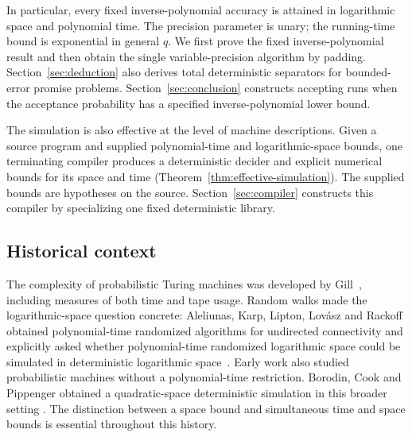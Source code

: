 In particular, every fixed inverse-polynomial accuracy is attained in
logarithmic space and polynomial time. The precision parameter is unary;
the running-time bound is exponential in general $q$. We first prove
the fixed inverse-polynomial result and then obtain the single
variable-precision algorithm by padding. Section~\ref{sec:deduction}
also derives total deterministic separators for bounded-error promise
problems. Section~\ref{sec:conclusion} constructs accepting runs when
the acceptance probability has a specified inverse-polynomial lower bound.

The simulation is also effective at the level of machine descriptions.
Given a source program and supplied polynomial-time and logarithmic-space
bounds, one terminating compiler produces a deterministic decider and
explicit numerical bounds for its space and time
(Theorem~\ref{thm:effective-simulation}). The supplied bounds are
hypotheses on the source.
Section~\ref{sec:compiler} constructs this compiler by specializing one
fixed deterministic library.

\subsection{Historical context}

The complexity of probabilistic Turing machines was developed by
Gill~\cite{Gill1977}, including measures of both time and tape usage.
Random walks made the logarithmic-space question concrete:
Aleliunas, Karp, Lipton, Lov\'asz and Rackoff obtained polynomial-time
randomized algorithms for undirected connectivity and explicitly asked
whether polynomial-time randomized logarithmic space could be simulated
in deterministic logarithmic space~\cite{AleliunasKLLR1979}.
Early work also studied probabilistic machines without a polynomial-time
restriction. Borodin, Cook and Pippenger obtained a quadratic-space
deterministic simulation in this broader setting
\cite{BorodinCookPippenger1983}.
The distinction between a space bound and simultaneous time and space
bounds is essential throughout this history.

